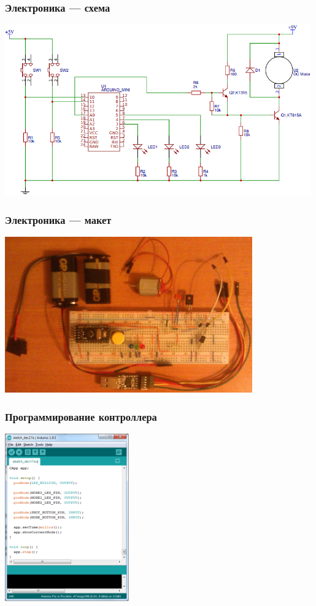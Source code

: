 \begin{frame}
    \frametitle{Электроника {\myDevice} --- схема}
    
    \begin{center}
        \includegraphics[width=0.99\textwidth]{fig/eScheme}
    \end{center}
\end{frame}

\begin{frame}
    \frametitle{Электроника {\myDevice} --- макет}
    
    \begin{center}
        \includegraphics[width=0.8\textwidth]{fig/eModel}
    \end{center}
\end{frame}

\begin{frame}
    \frametitle{Программирование контроллера \myDevice}
    
    \begin{center}
        \includegraphics[width=0.4\textwidth]{fig/programming}
    \end{center}
\end{frame}

